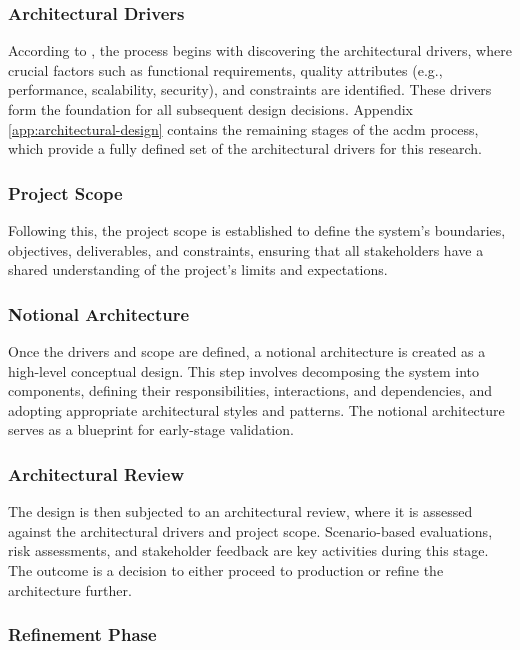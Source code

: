 \subsubsection{Architectural Drivers}

According to , the process begins with discovering the architectural drivers, where crucial factors such as functional requirements, quality attributes (e.g., performance, scalability, security), and constraints are identified. These drivers form the foundation for all subsequent design decisions. Appendix \ref{app:architectural-design} contains the remaining stages of the \ac{acdm} process, which provide a fully defined set of the architectural drivers for this research.

\subsubsection{Project Scope}

Following this, the project scope is established to define the system's boundaries, objectives, deliverables, and constraints, ensuring that all stakeholders have a shared understanding of the project's limits and expectations.

\subsubsection{Notional Architecture}

Once the drivers and scope are defined, a notional architecture is created as a high-level conceptual design. This step involves decomposing the system into components, defining their responsibilities, interactions, and dependencies, and adopting appropriate architectural styles and patterns. The notional architecture serves as a blueprint for early-stage validation.

\subsubsection{Architectural Review}

The design is then subjected to an architectural review, where it is assessed against the architectural drivers and project scope. Scenario-based evaluations, risk assessments, and stakeholder feedback are key activities during this stage. The outcome is a decision to either proceed to production or refine the architecture further.

\subsubsection{Refinement Phase}


